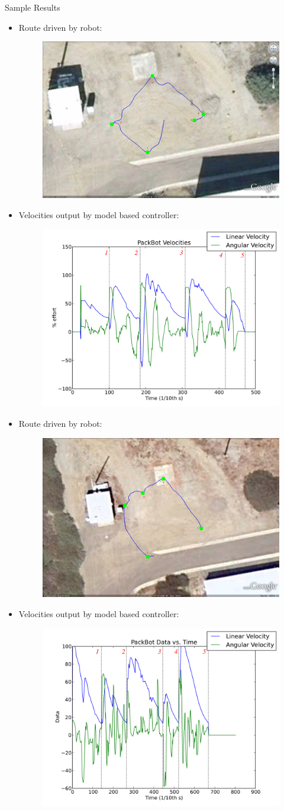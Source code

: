 \documentclass[hyperref={pdfpagelabels=false}]{beamer}
\begin{document}
\begin{frame}[allowframebreaks]{Sample Results}
\begin{itemize}
\item Route driven by robot:
\begin{figure}[ht!]
	\centering
	\includegraphics[width=.3\textwidth]{images/20100918_1717_GE_KF_waypts}
\end{figure}
\item Velocities output by model based controller:
\begin{figure}[ht!]
	\centering
	\includegraphics[width=.5\textwidth]{images/20100918_1717_velocities}
\end{figure}
\item Route driven by robot:
\begin{figure}[ht!]
	\centering
	\includegraphics[width=.3\textwidth]{images/20100929_1448_GE_KF_waypts}
\end{figure}
\item Velocities output by model based controller:
\begin{figure}[ht!]
	\centering
	\includegraphics[width=.5\textwidth]{images/20100929_1448_pbtx}
\end{figure}
\end{itemize}
\end{frame}
\end{document}
